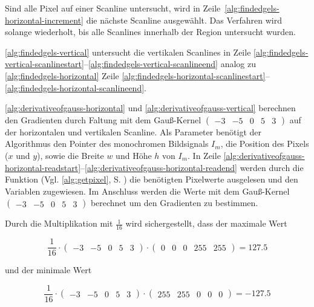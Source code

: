 Sind alle Pixel auf einer Scanline untersucht, wird in Zeile~\ref{alg:findedgels-horizontal-increment} die nächste
 Scanline ausgewählt. Das Verfahren wird solange wiederholt, bis alle Scanlines innerhalb der Region untersucht wurden.

\autoref{alg:findedgels-vertical} untersucht die vertikalen Scanlines in Zeile
 \ref{alg:findedgels-vertical-scanlinestart}--\ref{alg:findedgels-vertical-scanlineend} analog zu
 \autoref{alg:findedgels-horizontal} Zeile
 \ref{alg:findedgels-horizontal-scanlinestart}--\ref{alg:findedgels-horizontal-scanlineend}.

\autoref{alg:derivativeofgauss-horizontal} und \autoref{alg:derivativeofgauss-vertical} berechnen den Gradienten durch Faltung mit dem Gauß-Kernel
$\left( \begin{smallmatrix}
-3& -5& 0& 5& 3
\end{smallmatrix} \right)$
 auf der horizontalen und vertikalen Scanline. Als Parameter benötigt der Algorithmus den Pointer des monochromen
 Bildsignals $I_m$, die Position des Pixels ($x$ und $y$), sowie die Breite $w$ und Höhe $h$ von $I_m$. In Zeile
 \ref{alg:derivativeofgauss-horizontal-readstart}--\ref{alg:derivativeofgauss-horizontal-readend} werden durch die
 Funktion  (Vgl. \autoref{alg:getpixel}, S. \pageref{alg:getpixel}) die benötigten Pixelwerte
 ausgelesen und den Variablen zugewiesen. Im Anschluss werden die Werte mit dem Gauß-Kernel
$\left( \begin{smallmatrix}
-3& -5& 0& 5& 3
\end{smallmatrix} \right)$
berechnet um den Gradienten zu bestimmen.



Durch die Multiplikation mit $\tfrac{1}{16}$ wird sichergestellt, dass der maximale Wert

\begin{equation}
	\frac{1}{16}
	\cdot
	\begin{pmatrix}
		-3& -5& 0& 5& 3
	\end{pmatrix}
	\cdot
	\begin{pmatrix}
		0& 0& 0& 255& 255
	\end{pmatrix}
	= 127.5
\end{equation}

und der minimale Wert

\begin{equation}
	\frac{1}{16}
	\cdot
	\begin{pmatrix}
		-3& -5& 0& 5& 3
	\end{pmatrix}
	\cdot
	\begin{pmatrix}
		255& 255& 0& 0& 0
	\end{pmatrix}
	= -127.5
\end{equation}

